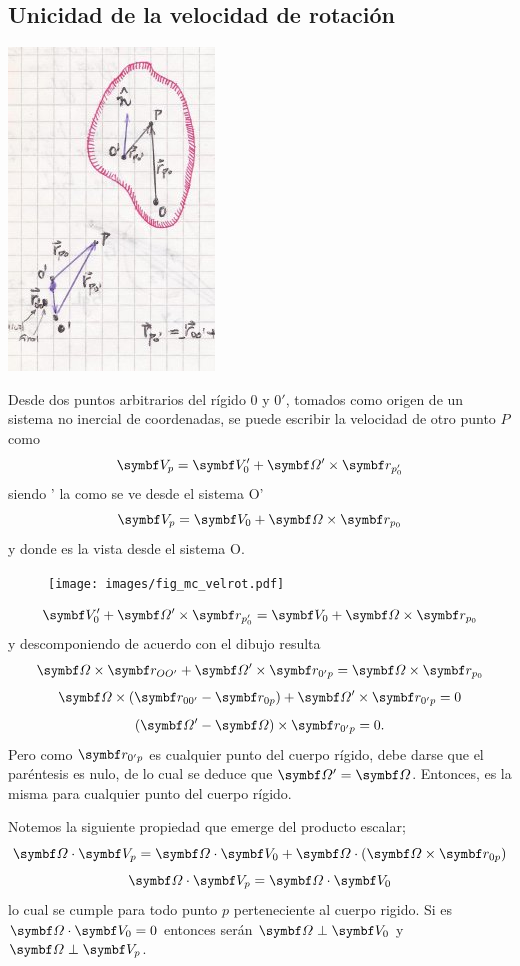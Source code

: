 \documentclass[10pt,oneside]{CBFT_book}
\begin{document}
\subsection{Unicidad de la velocidad de rotación}

\includegraphics[scale=0.4]{images/fig_mc_rigid_body_vel4.jpg}

Desde dos puntos arbitrarios del rígido $0$ y $0'$, tomados como origen de un sistema no inercial
de coordenadas, se puede escribir la velocidad de otro punto $P$ como
\[
	\vb{V}_{p} = \vb{V}_0' + \vb{\Omega}' \times \vb{r}_{p_0'}
\]
siendo \vb{\Omega}' la \vb{\Omega} como se ve desde el sistema O'
\[
	\vb{V}_{p} = \vb{V}_0 + \vb{\Omega} \times \vb{r}_{p_0}
\]
y donde \vb{\Omega} es la vista desde el sistema O.
\begin{figure}[htb]
	\begin{center}
	\texttt{[image: images/fig\_mc\_velrot.pdf]}	 
	\end{center}
	\caption{}
\end{figure} 
\[
	\vb{V}_0' + \vb{\Omega}' \times \vb{r}_{p_0'} = \vb{V}_0 + \vb{\Omega} \times \vb{r}_{p_0} 
\]
y descomponiendo de acuerdo con el dibujo resulta 
\[
	\vb{\Omega} \times \vb{r}_{OO'} + \vb{\Omega}' \times \vb{r}_{0'p} = \vb{\Omega} \times \vb{r}_{p_0} 
\]
\[
	\vb{\Omega} \times ( \vb{r}_{00'} - \vb{r}_{0p} ) + \vb{\Omega}' \times \vb{r}_{0'p}  = 0
\]
\[
	( \vb{\Omega}' - \vb{\Omega}  ) \times \vb{r}_{0'p} = 0.
\]
Pero como $\vb{r}_{0'p}$ es cualquier punto del cuerpo rígido, debe darse que el paréntesis es nulo, de
lo cual se deduce que $\vb{\Omega}'=\vb{\Omega}$. Entonces, \vb{\Omega} es la misma para cualquier
punto del cuerpo rígido.

Notemos la siguiente propiedad que emerge del producto escalar;
\[
	\vb{\Omega} \cdot \vb{V}_p = \vb{\Omega} \cdot \vb{V}_0 +
	\vb{\Omega}\cdot(\vb{\Omega}\times \vb{r}_{0p} )
\]
\[
	\vb{\Omega} \cdot \vb{V}_p = \vb{\Omega} \cdot \vb{V}_0
\]
lo cual se cumple para todo punto $p$ perteneciente al cuerpo rigido. Si es $\vb{\Omega} \cdot \vb{V}_0 = 0$
entonces serán $\vb{\Omega} \perp \vb{V}_0$ y $\vb{\Omega} \perp \vb{V}_p$.
\end{document}
